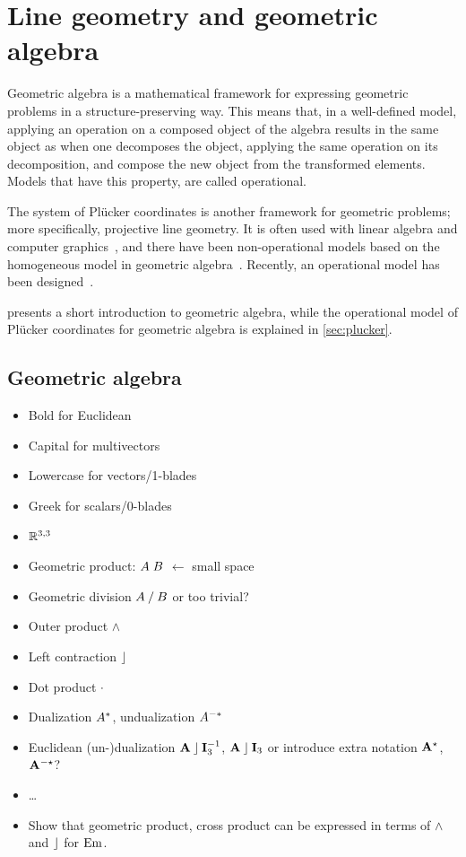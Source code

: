 \section{Line geometry and geometric algebra}
\label{ch:background}

Geometric algebra is a mathematical framework for expressing geometric problems in a structure-preserving way.  This means that, in a well-defined model, applying an operation on a composed object of the algebra results in the same object as when one decomposes the object, applying the same operation on its decomposition, and compose the new object from the transformed elements.  Models that have this property, are called operational.

The system of Pl\"ucker coordinates is another framework for geometric problems; more specifically, projective line geometry.  It is often used with linear algebra and computer graphics~\cite{Shoemake}, and there have been non-operational models based on the homogeneous model in geometric algebra~\cite[Chapter 12]{TheBook}.  Recently, an operational model has been designed~\cite{Hongbo}.

 presents a short introduction to geometric algebra, while the operational model of Pl\"ucker coordinates for geometric algebra is explained in \autoref{sec:plucker}.

\subsection{Geometric algebra}
\label{sec:intro-ga}


\begin{itemize}
  \item Bold for Euclidean
  \item Capital for multivectors
  \item Lowercase for vectors/1-blades
  \item Greek for scalars/0-blades
  \item $\mathbb{R}^{3,3}$
  \item Geometric product: $A \; B$ $\leftarrow$ small space
  \item Geometric division $A \mathbin{/} B$ or too trivial?
  \item Outer product $\wedge$
  \item Left contraction $\mathbin{\rfloor}$
  \item Dot product $\mathbin{\cdot}$
  \item Dualization $A^\ast$, undualization $A^{-\ast}$
  \item Euclidean (un-)dualization $\mathbf{A} \mathbin{\rfloor} \mathbf{I}_3^{-1}$, $\mathbf{A} \mathbin{\rfloor} \mathbf{I}_3$ or introduce extra notation $\mathbf{A}^{\star}$, $\mathbf{A}^{-\star}$?
  \item \ldots
  \item Show that geometric product, cross product can be expressed in terms of $\wedge$ and $\mathbin{\rfloor}$ for $\operatorname{Em}$.
\end{itemize}

